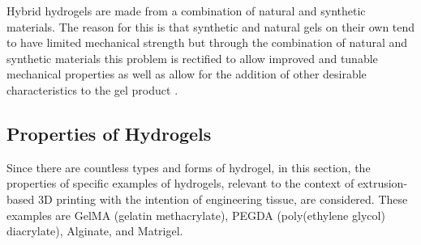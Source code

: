 Hybrid hydrogels are made from a combination of natural and synthetic materials. The reason for this is that synthetic and natural gels on their own tend to have limited mechanical strength but through the combination of natural and synthetic materials this problem is rectified to allow improved and tunable mechanical properties as well as allow for the addition of other desirable characteristics to the gel product \citep{liwu2020}.

\subsection{Properties of Hydrogels}
Since there are countless types and forms of  hydrogel, in this section, the properties of specific examples of hydrogels, relevant to the context of extrusion-based 3D printing with the intention of engineering tissue, are considered. These examples are GelMA (gelatin methacrylate), PEGDA (poly(ethylene glycol) diacrylate), Alginate, and Matrigel.
